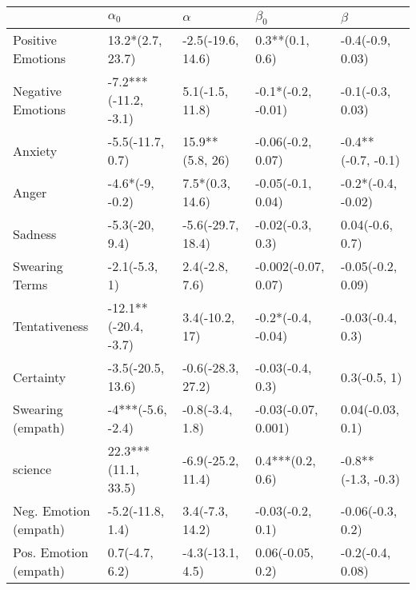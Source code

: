 \begin{tabular}{lllll}
\toprule
{} &            $\alpha_0$ &           $\alpha$ &            $\beta_0$ &             $\beta$ \\
\midrule
Positive Emotions     &      13.2*(2.7, 23.7) &  -2.5(-19.6, 14.6) &      0.3**(0.1, 0.6) &    -0.4(-0.9, 0.03) \\
Negative Emotions     &  -7.2***(-11.2, -3.1) &    5.1(-1.5, 11.8) &   -0.1*(-0.2, -0.01) &    -0.1(-0.3, 0.03) \\
Anxiety               &      -5.5(-11.7, 0.7) &    15.9**(5.8, 26) &    -0.06(-0.2, 0.07) &  -0.4**(-0.7, -0.1) \\
Anger                 &       -4.6*(-9, -0.2) &    7.5*(0.3, 14.6) &    -0.05(-0.1, 0.04) &  -0.2*(-0.4, -0.02) \\
Sadness               &        -5.3(-20, 9.4) &  -5.6(-29.7, 18.4) &     -0.02(-0.3, 0.3) &     0.04(-0.6, 0.7) \\
Swearing Terms        &         -2.1(-5.3, 1) &     2.4(-2.8, 7.6) &  -0.002(-0.07, 0.07) &   -0.05(-0.2, 0.09) \\
Tentativeness         &  -12.1**(-20.4, -3.7) &     3.4(-10.2, 17) &   -0.2*(-0.4, -0.04) &    -0.03(-0.4, 0.3) \\
Certainty             &     -3.5(-20.5, 13.6) &  -0.6(-28.3, 27.2) &     -0.03(-0.4, 0.3) &        0.3(-0.5, 1) \\
Swearing (empath)     &     -4***(-5.6, -2.4) &    -0.8(-3.4, 1.8) &  -0.03(-0.07, 0.001) &    0.04(-0.03, 0.1) \\
science               &   22.3***(11.1, 33.5) &  -6.9(-25.2, 11.4) &     0.4***(0.2, 0.6) &  -0.8**(-1.3, -0.3) \\
Neg. Emotion (empath) &      -5.2(-11.8, 1.4) &    3.4(-7.3, 14.2) &     -0.03(-0.2, 0.1) &    -0.06(-0.3, 0.2) \\
Pos. Emotion (empath) &        0.7(-4.7, 6.2) &   -4.3(-13.1, 4.5) &     0.06(-0.05, 0.2) &    -0.2(-0.4, 0.08) \\
\bottomrule
\end{tabular}
